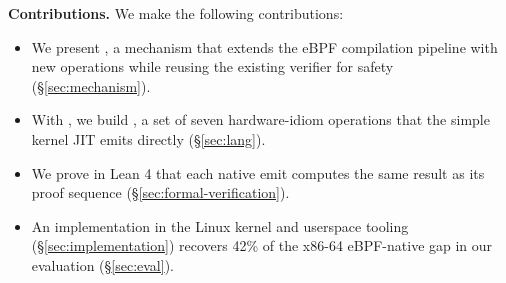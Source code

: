 \noindent\textbf{Contributions.}
We make the following contributions:
\begin{itemize}
    \item We present \tool, a mechanism that extends the eBPF compilation pipeline with new operations while reusing the existing verifier for safety (\S\ref{sec:mechanism}).
    \item With \tool, we build \lang, a set of seven hardware-idiom operations that the simple kernel JIT emits directly (\S\ref{sec:lang}).
    \item We prove in Lean 4 that each \lang native emit computes the same result as its proof sequence (\S\ref{sec:formal-verification}).
    \item An implementation in the Linux kernel and userspace tooling (\S\ref{sec:implementation}) recovers 42\% of the x86-64 eBPF-native gap in our evaluation (\S\ref{sec:eval}).
\end{itemize}